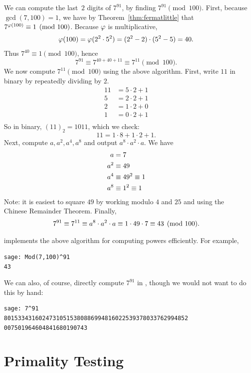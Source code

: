 \begin{example}
We can compute the last~$2$ digits of $7^{91}$, by
finding $7^{91}\pmod{100}$.
First, because $\gcd(7,100)=1$, we have by
Theorem~\ref{thm:fermatlittle} that
$7^{\varphi(100)} \equiv 1\pmod{100}$.
Because $\varphi$ is multiplicative,
$$
  \varphi(100) = \varphi(2^2\cdot 5^2) = (2^2-2)\cdot(5^2-5)=40.
$$
Thus
$7^{40} \equiv 1\pmod{100}$, hence
$$
 7^{91} \equiv 7^{40 + 40 + 11} \equiv 7^{11} \pmod{100}.
$$
We now compute $7^{11}\pmod{100}$ using the above algorithm.
First, write $11$ in binary by repeatedly dividing by $2$.
\begin{align*}
    11 &= 5\cdot 2 + 1\\
     5 &= 2\cdot 2 + 1\\
     2 &= 1\cdot 2 + 0\\
     1 &= 0\cdot 2 + 1\\
   \end{align*}
So in binary, $(11)_2 = 1011$,
  which we check:
$$
     11 = 1\cdot8 + 1\cdot2 + 1.
$$
Next, compute $a, a^2, a^4, a^8$ and output
        $a^8 \cdot a^2 \cdot a$.
We have
\begin{align*}
    a &= 7 \\
    a^2 &\equiv 49 \\
    a^4 &\equiv 49^2 \equiv 1\\
    a^8 &\equiv 1^2 \equiv 1\\
\end{align*}
Note: it is easiest to square $49$ by working modulo $4$ and $25$
and using the Chinese Remainder Theorem.
Finally,
$$
 7^{91} \equiv 7^{11} \equiv
    a^8 \cdot a^2 \cdot a \equiv 1 \cdot 49 \cdot 7 \equiv 43 \pmod{100}.
$$
\end{example}

\begin{sg}
\sage implements the above algorithm for computing powers
efficiently.  For example,
\begin{verbatim}
sage: Mod(7,100)^91
43
\end{verbatim}
\noindent{}We can also, of course, directly compute $7^{91}$ in
\sage, though we would not want to do this by hand:
\begin{verbatim}
sage: 7^91
80153343160247310515380886994816022539378033762994852
007501964604841680190743
\end{verbatim}
\end{sg}

\section{Primality Testing}
\label{sec:prob_prime_test}

